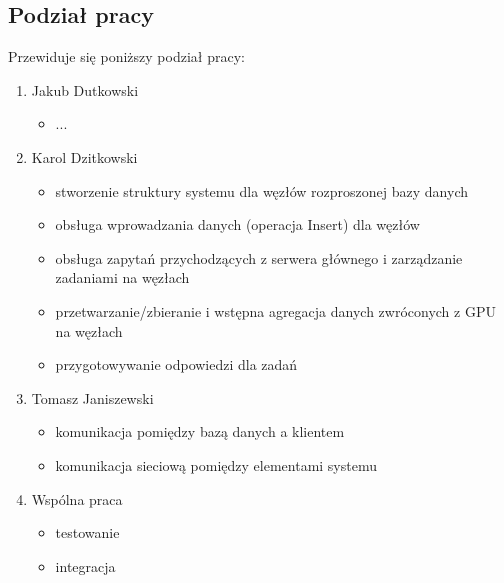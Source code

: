 \documentclass[paper=a4, fontsize=11pt]{scrartcl} %
\numberwithin{equation}{section} %
\numberwithin{figure}{section} %
\numberwithin{table}{section} %
\begin{document}
    \subsection{Podział pracy}
    Przewiduje się poniższy podział pracy:
        \begin{enumerate}
            \item Jakub Dutkowski
                \begin{itemize}
                    \item ...
                \end{itemize}
            \item Karol Dzitkowski
                \begin{itemize}
                    \item stworzenie struktury systemu dla węzłów rozproszonej bazy danych
                    \item obsługa wprowadzania danych (operacja Insert) dla węzłów
                    \item obsługa zapytań przychodzących z serwera głównego i zarządzanie zadaniami na węzłach
                    \item przetwarzanie/zbieranie i wstępna agregacja danych zwróconych z GPU na węzłach
                    \item przygotowywanie odpowiedzi dla zadań
                \end{itemize}
            \item Tomasz Janiszewski
                \begin{itemize}
                    \item komunikacja pomiędzy bazą danych a klientem
                    \item komunikacja sieciową pomiędzy elementami systemu
                \end{itemize}
            \item Wspólna praca
                \begin{itemize}
                    \item testowanie
                    \item integracja
                \end{itemize}
        \end{enumerate}
\end{document}
